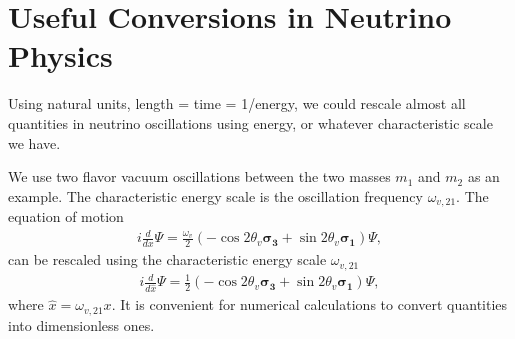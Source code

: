 \section{Useful Conversions in Neutrino Physics}

Using natural units, length = time = 1/energy, we could rescale almost all quantities in neutrino oscillations using energy, or whatever characteristic scale we have.

We use two flavor vacuum oscillations between the two masses $m_1$ and $m_2$ as an example. The characteristic energy scale is the oscillation frequency $\omega_{v,21}$. The equation of motion
\begin{align}
   i\frac{d}{d x} \Psi = \frac{\omega_v}{2}(-\cos 2\theta_v \boldsymbol{\sigma_3} + \sin 2\theta_v \boldsymbol{\sigma_1}) \Psi,
\end{align}
can be rescaled using the characteristic energy scale $\omega_{v,21}$
\begin{align}
   i\frac{d}{d \hat x} \Psi = \frac{1}{2}(-\cos 2\theta_v \boldsymbol{\sigma_3} + \sin 2\theta_v \boldsymbol{\sigma_1})\Psi ,
\end{align}
where $\hat x = \omega_{v,21} x$. It is convenient for numerical calculations to convert quantities into dimensionless ones.

